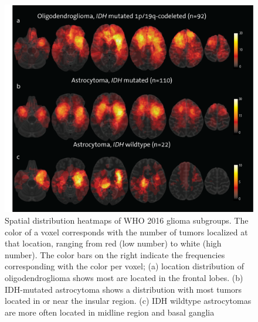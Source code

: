 \begin{figure}
    \centering
    \includegraphics[width=\textwidth]{Figures/Figure_1.png}
    \caption{Spatial distribution heatmaps of \acrshort{WHO} 2016 glioma subgroups. The color of a voxel corresponds with the number of \glspl{tumor} localized at that
    location, ranging from red (low number) to white (high number). The color bars on the right indicate the frequencies corresponding with the color
    per voxel; (a) location distribution of oligodendroglioma shows most are located in the frontal lobes. (b) \acrshort{IDH}-mutated astrocytoma shows a distribution with most \glspl{tumor} located in or near the insular region. (c) \acrshort{IDH} wildtype astrocytomas are more often located in midline region and basal
    ganglia}\label{fig:LGG_location_heatmap_subgroups}
    \end{figure}


